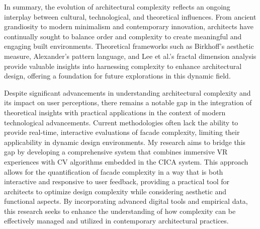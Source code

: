 In summary, the evolution of architectural complexity reflects an ongoing interplay between cultural, technological, and theoretical influences.
From ancient grandiosity to modern minimalism and contemporary innovation, architects have continually sought to balance order and complexity to create meaningful and engaging built environments.
Theoretical frameworks such as Birkhoff's aesthetic measure, Alexander's pattern language, and Lee et al.'s fractal dimension analysis provide valuable insights into harnessing complexity to enhance architectural design, offering a foundation for future explorations in this dynamic field.

Despite significant advancements in understanding architectural complexity and its impact on user perceptions, there remains a notable gap in the integration of theoretical insights with practical applications in the context of modern technological advancements.
Current methodologies often lack the ability to provide real-time, interactive evaluations of facade complexity, limiting their applicability in dynamic design environments.
My research aims to bridge this gap by developing a comprehensive system that combines immersive VR experiences with CV algorithms embedded in the CICA system.
This approach allows for the quantification of facade complexity in a way that is both interactive and responsive to user feedback, providing a practical tool for architects to optimize design complexity while considering aesthetic and functional aspects.
By incorporating advanced digital tools and empirical data, this research seeks to enhance the understanding of how complexity can be effectively managed and utilized in contemporary architectural practices.

